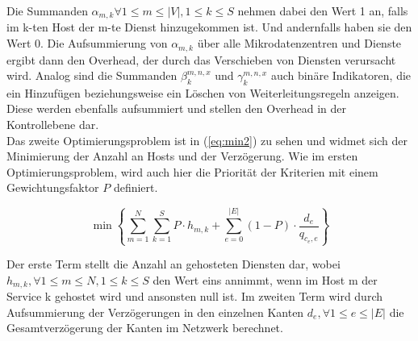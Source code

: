 \documentclass[conference]{IEEEtran}
\begin{document}
Die Summanden \(\alpha_{m,k} \forall 1\le m \le |V|, 1 \le k \le S\) nehmen dabei den Wert 1 an, falls im k-ten Host der m-te Dienst hinzugekommen ist. Und andernfalls haben sie den Wert 0. Die Aufsummierung von \(\alpha_{m,k}\) über alle Mikrodatenzentren und Dienste ergibt dann den Overhead, der durch das Verschieben von Diensten verursacht wird. 
Analog sind die Summanden \(\beta_{k}^{m,n,x}\) und \(\gamma_{k}^{m,n,x}\) auch binäre Indikatoren, die ein Hinzufügen beziehungsweise ein Löschen von Weiterleitungsregeln anzeigen. Diese werden ebenfalls aufsummiert und stellen den Overhead in der Kontrollebene dar.\\
Das zweite Optimierungsproblem ist in (\ref{eq:min2}) zu sehen und widmet sich der Minimierung der Anzahl an Hosts und der Verzögerung. Wie im ersten Optimierungsproblem, wird auch hier die Priorität der Kriterien mit einem Gewichtungsfaktor \(P\) definiert.

\begin{equation}
\min \left\{ \sum_{m=1}^N \sum_{k=1}^S P \cdot h_{m,k} + \sum_{e=0}^{|E|} (1-P) \cdot \frac{d_e}{q_{c_{e},e}} \right\}
\label{eq:min2}
\end{equation}

Der erste Term stellt die Anzahl an gehosteten Diensten dar, wobei \(h_{m,k},\forall 1 \le m \le N, 1\le k \le S\) den Wert eins annimmt, wenn im Host m der Service k gehostet wird und ansonsten null ist.
Im zweiten Term wird durch Aufsummierung der Verzögerungen in den einzelnen Kanten \(d_e, \forall 1 \le e \le |E|\) die Gesamtverzögerung der Kanten im Netzwerk berechnet.
\end{document}
